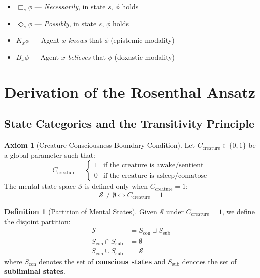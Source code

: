 \documentclass[11pt,a4paper]{article}
\theoremstyle{definition}
\newtheorem{definition}{Definition}[section]
\newtheorem{axiom}{Axiom}[section]
\theoremstyle{remark}
\newcommand{\Sset}{\mathcal{S}}
\newcommand{\Scon}{S_{\text{con}}}
\newcommand{\Ssub}{S_{\text{sub}}}
\newcommand{\Ccreature}{C_{\text{creature}}}
\begin{document}
\vspace{1em}

\begin{tcolorbox}[colback=gray!10!white, colframe=gray!75!black, title=\textbf{Modal Operators}]
\begin{itemize}
    \item $\Box_s \phi$ --- \textit{Necessarily}, in state $s$, $\phi$ holds
    \item $\Diamond_s \phi$ --- \textit{Possibly}, in state $s$, $\phi$ holds
    \item $K_x \phi$ --- Agent $x$ \textit{knows} that $\phi$ (epistemic modality)
    \item $B_x \phi$ --- Agent $x$ \textit{believes} that $\phi$ (doxastic modality)
\end{itemize}
\end{tcolorbox}

\newpage

\section{Derivation of the Rosenthal Ansatz}

\subsection{State Categories and the Transitivity Principle}

\begin{axiom}[Creature Consciousness Boundary Condition]
\label{ax:creature}
Let $\Ccreature \in \{0,1\}$ be a global parameter such that:
\begin{equation}
\Ccreature =
\begin{cases}
1 & \text{if the creature is awake/sentient} \\
0 & \text{if the creature is asleep/comatose}
\end{cases}
\end{equation}
The mental state space $\Sset$ is defined only when $\Ccreature = 1$:
\begin{equation}
\Sset \neq \emptyset \iff \Ccreature = 1
\end{equation}
\end{axiom}

\begin{definition}[Partition of Mental States]
\label{def:partition}
Given $\Sset$ under $\Ccreature = 1$, we define the disjoint partition:
\begin{align}
\Sset &= \Scon \sqcup \Ssub \\
\Scon \cap \Ssub &= \emptyset \\
\Scon \cup \Ssub &= \Sset
\end{align}
where $\Scon$ denotes the set of \textbf{conscious states} and $\Ssub$ denotes the set of \textbf{subliminal states}.
\end{definition}
\end{document}
